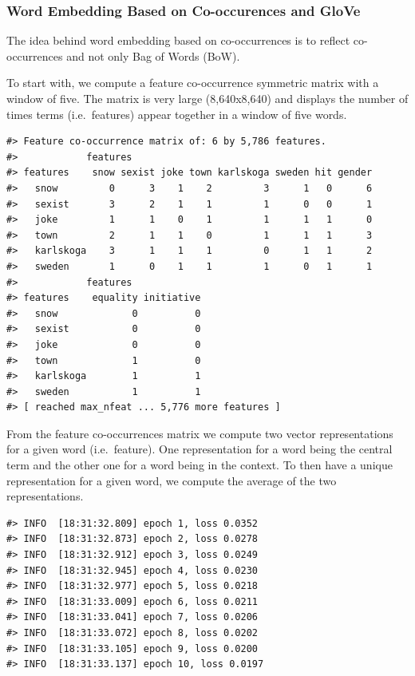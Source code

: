 \documentclass[
]{article}
\begin{document}
\hypertarget{word-embedding-based-on-co-occurences-and-glove}{%
\subsubsection{Word Embedding Based on Co-occurences and
GloVe}\label{word-embedding-based-on-co-occurences-and-glove}}

The idea behind word embedding based on co-occurrences is to reflect
co-occurrences and not only Bag of Words (BoW).

To start with, we compute a feature co-occurrence symmetric matrix with
a window of five. The matrix is very large (8,640x8,640) and displays
the number of times terms (i.e.~features) appear together in a window of
five words.

\begin{verbatim}
#> Feature co-occurrence matrix of: 6 by 5,786 features.
#>            features
#> features    snow sexist joke town karlskoga sweden hit gender
#>   snow         0      3    1    2         3      1   0      6
#>   sexist       3      2    1    1         1      0   0      1
#>   joke         1      1    0    1         1      1   1      0
#>   town         2      1    1    0         1      1   1      3
#>   karlskoga    3      1    1    1         0      1   1      2
#>   sweden       1      0    1    1         1      0   1      1
#>            features
#> features    equality initiative
#>   snow             0          0
#>   sexist           0          0
#>   joke             0          0
#>   town             1          0
#>   karlskoga        1          1
#>   sweden           1          1
#> [ reached max_nfeat ... 5,776 more features ]
\end{verbatim}

From the feature co-occurrences matrix we compute two vector
representations for a given word (i.e.~feature). One representation for
a word being the central term and the other one for a word being in the
context. To then have a unique representation for a given word, we
compute the average of the two representations.

\begin{verbatim}
#> INFO  [18:31:32.809] epoch 1, loss 0.0352 
#> INFO  [18:31:32.873] epoch 2, loss 0.0278 
#> INFO  [18:31:32.912] epoch 3, loss 0.0249 
#> INFO  [18:31:32.945] epoch 4, loss 0.0230 
#> INFO  [18:31:32.977] epoch 5, loss 0.0218 
#> INFO  [18:31:33.009] epoch 6, loss 0.0211 
#> INFO  [18:31:33.041] epoch 7, loss 0.0206 
#> INFO  [18:31:33.072] epoch 8, loss 0.0202 
#> INFO  [18:31:33.105] epoch 9, loss 0.0200 
#> INFO  [18:31:33.137] epoch 10, loss 0.0197
\end{verbatim}
\end{document}
